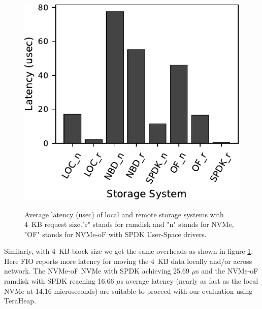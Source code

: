 \begin{figure}[H]
  \includegraphics[width=\linewidth]{figures/fio_4k.pdf}\\
\caption{Average latency (usec) of local and remote storage systems with \SI{4}{KB} request size."r" stands for ramdisk and "n" stands for NVMe, "OF" stands for NVMe-oF with SPDK User-Space drivers.}
\label{fig:fio_4k}
\end{figure}

Similarly, with \SI{4}{KB} block size we get the same overheads as shown in figure
\ref{fig:fio_4k}. Here FIO reports more latency for moving the \SI{4}{KB} data locally
and/or across network. The NVMe-oF NVMe with SPDK achieving 25.69 $\mu$s and the
NVMe-oF ramdisk with SPDK reaching 16.66 $\mu$s average latency (nearly as fast
as the local NVMe at 14.16 microseconds) are suitable to proceed with our
evaluation using TeraHeap.



